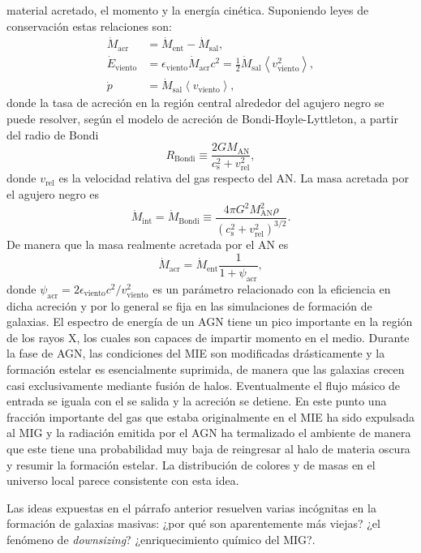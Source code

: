 \documentclass{article}
\begin{document}
\begin{description}
material acretado, el momento y la energía cinética. Suponiendo leyes de conservación estas
relaciones son:
%
\begin{align}
\dot{M}_\text{acr}    &= \dot{M}_\text{ent} - \dot{M}_\text{sal}, \nonumber\\
\dot{E}_\text{viento} &= \epsilon_\text{viento}\dot{M}_\text{acr}c^2 = \frac{1}{2}\dot{M}_\text{sal}\left<v_\text{viento}^2\right>, \nonumber\\
\dot{p}               &= \dot{M}_\text{sal}\left<v_\text{viento}\right>, \nonumber
\end{align}
%
donde la tasa de acreción en la región central alrededor del agujero negro se puede resolver, según
el modelo de acreción de Bondi-Hoyle-Lyttleton, a partir del radio de Bondi
%
$$
R_\text{Bondi} \equiv \frac{2GM_\text{AN}}{c_\text{s}^2 + v_\text{rel}^2},
$$
%
donde $v_\text{rel}$ es la velocidad relativa del gas respecto del AN. La masa acretada por el
agujero negro es
%
$$
\dot{M}_\text{int} = \dot{M}_\text{Bondi} \equiv \frac{4\pi G^2M_\text{AN}^2\rho}{\left(c_\text{s}^2 + v_\text{rel}^2\right)^{3/2}}.
$$
%
De manera que la masa realmente acretada por el AN es
%
$$
\dot{M}_\text{acr} = \dot{M}_\text{ent}\frac{1}{1+\psi_\text{acr}},
$$
%
donde $\psi_\text{acr} = 2\epsilon_\text{viento}c^2/v_\text{viento}^2$ es un parámetro relacionado
con la eficiencia en dicha acreción y por lo general se fija en las simulaciones de formación de
galaxias.
%
%
El espectro de energía de un AGN tiene un pico importante en la región de los rayos X, los cuales
son capaces de impartir momento en el medio. Durante la fase de AGN, las condiciones del MIE son
modificadas drásticamente y la formación estelar es esencialmente suprimida, de manera que las
galaxias crecen casi exclusivamente mediante fusión de halos. Eventualmente el flujo másico de
entrada se iguala con el se salida y la acreción se detiene. En este punto una fracción importante
del gas que estaba originalmente en el MIE ha sido expulsada al MIG y la radiación emitida por el
AGN ha termalizado el ambiente de manera que este tiene una probabilidad muy baja de reingresar al
halo de materia oscura y resumir la formación estelar. La distribución de colores y de masas en el
universo local parece consistente con esta idea.

Las ideas expuestas en el párrafo anterior resuelven varias incógnitas en la formación de galaxias
masivas: ¿por qué son aparentemente más viejas? ¿el fenómeno de \emph{downsizing}? ¿enriquecimiento
químico del MIG?.
%
\end{description}
\end{document}
